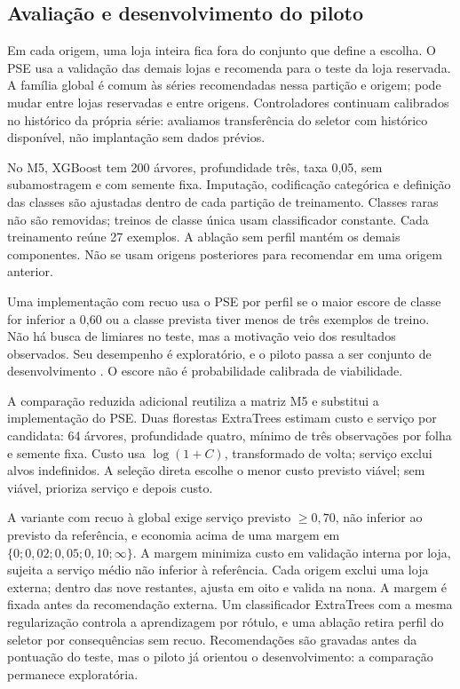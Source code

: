 \documentclass[preprint,12pt]{elsarticle}
\begin{document}
\subsection{Avaliação e desenvolvimento do piloto}
Em cada origem, uma loja inteira fica fora do conjunto que define a escolha. O PSE usa a validação das demais lojas e recomenda para o teste da loja reservada. A família global é comum às séries recomendadas nessa partição e origem; pode mudar entre lojas reservadas e entre origens. Controladores continuam calibrados no histórico da própria série: avaliamos transferência do seletor com histórico disponível, não implantação sem dados prévios.

No M5, XGBoost tem 200 árvores, profundidade três, taxa 0,05, sem subamostragem e com semente fixa. Imputação, codificação categórica e definição das classes são ajustadas dentro de cada partição de treinamento. Classes raras não são removidas; treinos de classe única usam classificador constante. Cada treinamento reúne 27 exemplos. A ablação sem perfil mantém os demais componentes. Não se usam origens posteriores para recomendar em uma origem anterior.

Uma implementação com recuo usa o PSE por perfil se o maior escore de classe for inferior a 0,60 ou a classe prevista tiver menos de três exemplos de treino. Não há busca de limiares no teste, mas a motivação veio dos resultados observados. Seu desempenho é exploratório, e o piloto passa a ser conjunto de desenvolvimento \cite{CawleyTalbot2010}. O escore não é probabilidade calibrada de viabilidade.

A comparação reduzida adicional reutiliza a matriz M5 e substitui a implementação do PSE. Duas florestas ExtraTrees estimam custo e serviço por candidata: 64 árvores, profundidade quatro, mínimo de três observações por folha e semente fixa. Custo usa $\log(1+C)$, transformado de volta; serviço exclui alvos indefinidos. A seleção direta escolhe o menor custo previsto viável; sem viável, prioriza serviço e depois custo.

A variante com recuo à global exige serviço previsto $\geq0{,}70$, não inferior ao previsto da referência, e economia acima de uma margem em $\{0;0{,}02;0{,}05;0{,}10;\infty\}$. A margem minimiza custo em validação interna por loja, sujeita a serviço médio não inferior à referência. Cada origem exclui uma loja externa; dentro das nove restantes, ajusta em oito e valida na nona. A margem é fixada antes da recomendação externa. Um classificador ExtraTrees com a mesma regularização controla a aprendizagem por rótulo, e uma ablação retira perfil do seletor por consequências sem recuo. Recomendações são gravadas antes da pontuação do teste, mas o piloto já orientou o desenvolvimento: a comparação permanece exploratória.
\end{document}
